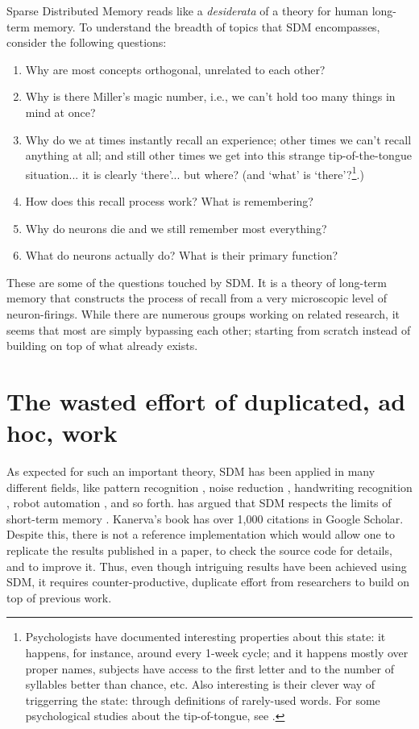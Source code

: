Sparse Distributed Memory reads like a \emph{desiderata} of a theory for human long-term memory.  To understand the breadth of topics that SDM encompasses, consider the following questions:
\begin{enumerate}
    \item Why are most concepts orthogonal, unrelated to each other?
    \item Why is there Miller's magic number, i.e., we can't hold too many things in mind at once?
    \item Why do we at times instantly recall an experience; other times we can't recall anything at all; and still other times we get into this strange tip-of-the-tongue situation... it is clearly `there'... but where?  (and `what' is `there'?\footnote{Psychologists have documented interesting properties about this state:  it happens, for instance, around every 1-week cycle; and it happens mostly over proper names, subjects have access to the first letter and to the number of syllables better than chance, etc. Also interesting is their clever way of triggerring the state: through definitions of rarely-used words.  For some psychological studies about the tip-of-tongue, see \citet{meyer_tip---tongue_1992, brown_review_1991, brown_tip_1966}.}.)
    \item How does this recall process work?  What is remembering?
    \item Why do neurons die and we still remember most everything?
    \item What do neurons actually do?  What is their primary function?
\end{enumerate}

These are some of the questions touched by SDM.  It is a theory of long-term memory that constructs the process of recall from a very microscopic level of neuron-firings. While there are numerous groups working on related research, it seems that most are simply bypassing each other; starting from scratch instead of building on top of what already exists.


\section{The wasted effort of duplicated, ad hoc, work}

As expected for such an important theory, SDM has been applied in many different fields, like pattern recognition \citep{norman2003modeling, rao1995natural}, noise reduction \citep{Meng2009}, handwriting recognition \citep{fan1997genetic}, robot automation \citep{Rajesh1998, mendes2008robot}, and so forth. \citet{Linhares2011} has argued that SDM respects the limits of short-term memory \citep{Miller1955, Cowan2001}. Kanerva's book has over 1,000 citations in Google Scholar.  Despite this, there is not a reference implementation which would allow one to replicate the results published in a paper, to check the source code for details, and to improve it. Thus, even though intriguing results have been achieved using SDM, it requires counter-productive, duplicate effort from researchers to build on top of previous work.

